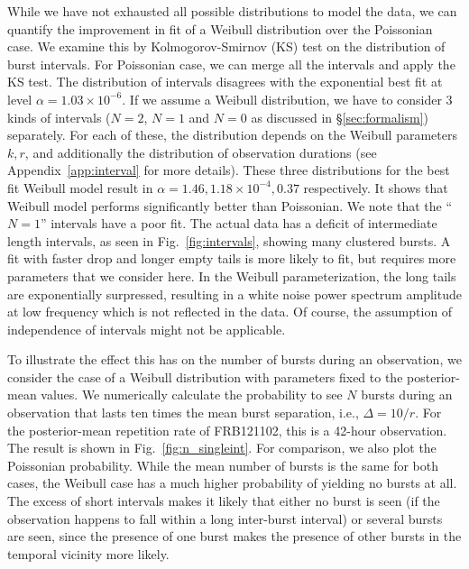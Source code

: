 \documentclass[fleqn,usenatbib]{mnras}
\newcommand{\new}[1]{#1}
\newcommand{\tcb}{}%
\begin{document}
\tcb{ While we have not exhausted all possible distributions to model the data, 
we can quantify the improvement in fit of
a Weibull distribution over the Poissonian case. We examine this by Kolmogorov-Smirnov (KS) test on the distribution of burst intervals. For Poissonian case, we can merge all the intervals and apply the KS test. The distribution of intervals disagrees with the exponential best fit at level $\alpha=1.03\times 10^{-6}$. If we assume a Weibull distribution, we have to consider 3 kinds of intervals ($N=2$, $N=1$ and $N=0$ as discussed in \S \ref{sec:formalism}) separately. For each of these, the distribution depends on the Weibull parameters $k,r$, and additionally the distribution of observation durations (see Appendix~\ref{app:interval} for more details). These three distributions for the best fit Weibull model result in $\alpha=1.46, 1.18\times 10^{-4}, 0.37$ respectively. It shows that Weibull model performs significantly better than Poissonian.
We note that the ``$N=1$'' intervals have a poor fit. 
The actual data has a deficit of intermediate length intervals, as seen in
Fig.~\ref{fig:intervals}, showing many
clustered bursts.  A fit with faster drop and longer empty tails is more likely to fit, but requires more parameters that we consider here.  In the Weibull parameterization, the long tails are exponentially surpressed, resulting in a white noise power spectrum amplitude at low frequency which is not reflected in the data.  Of course, the assumption of independence of intervals might not be applicable.
}



To illustrate the effect this has on the number of bursts during an observation, we consider the case of a Weibull distribution with parameters fixed to the posterior-mean values. We numerically calculate the probability to see $N$ bursts during an observation that lasts ten times the mean burst separation, i.e., $\Delta = 10/r$. \new{For the posterior-mean repetition rate of FRB121102, this is a 42-hour observation. The result} is shown in Fig.~\ref{fig:n_singleint}. For comparison, we also plot the Poissonian probability. While the mean number of bursts is the same for both cases, the Weibull case has a much higher probability of yielding no bursts at all. The excess of short intervals makes it likely that either no burst is seen (if the observation happens to fall within a long inter-burst interval) or several bursts are seen, since the presence of one burst makes the presence of other bursts in the temporal vicinity more likely.
\end{document}
